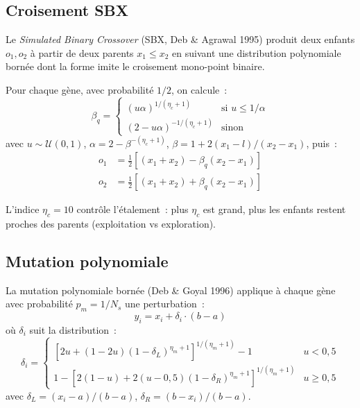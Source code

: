 \documentclass[12pt,a4paper]{article}
\numberwithin{equation}{section}
\numberwithin{figure}{section}
\numberwithin{table}{section}
\begin{document}
\subsection{Croisement SBX}

Le \emph{Simulated Binary Crossover} (SBX, Deb \& Agrawal 1995) produit deux
enfants $o_1, o_2$ à partir de deux parents $x_1 \leq x_2$ en suivant une
distribution polynomiale bornée dont la forme imite le croisement mono-point binaire.

Pour chaque gène, avec probabilité $1/2$, on calcule~:
\begin{equation}
    \beta_q = \begin{cases}
        (u\alpha)^{1/({\eta_c+1})} & \text{si } u \leq 1/\alpha \\
        (2-u\alpha)^{-1/({\eta_c+1})} & \text{sinon}
    \end{cases}
    \label{eq:sbx_beta}
\end{equation}
avec $u \sim \mathcal{U}(0,1)$,
$\alpha = 2 - \beta^{-(\eta_c+1)}$,
$\beta = 1 + 2(x_1 - l)/(x_2 - x_1)$,
puis~:
\begin{align}
    o_1 &= \tfrac{1}{2}\left[(x_1+x_2) - \beta_q(x_2-x_1)\right] \\
    o_2 &= \tfrac{1}{2}\left[(x_1+x_2) + \beta_q(x_2-x_1)\right]
    \label{eq:sbx_children}
\end{align}

L'indice $\eta_c = 10$ contrôle l'étalement~: plus $\eta_c$ est grand,
plus les enfants restent proches des parents (exploitation vs exploration).

\subsection{Mutation polynomiale}

La mutation polynomiale bornée (Deb \& Goyal 1996) applique à chaque gène
avec probabilité $p_m = 1/N_s$ une perturbation~:
\begin{equation}
    y_i = x_i + \delta_i \cdot (b-a)
    \label{eq:pm_mutation}
\end{equation}
où $\delta_i$ suit la distribution~:
\begin{equation}
    \delta_i = \begin{cases}
        \left[2u + (1-2u)(1-\delta_L)^{\eta_m+1}\right]^{1/(\eta_m+1)} - 1
        & u < 0{,}5 \\
        1 - \left[2(1-u) + 2(u-0{,}5)(1-\delta_R)^{\eta_m+1}\right]^{1/(\eta_m+1)}
        & u \geq 0{,}5
    \end{cases}
    \label{eq:pm_delta}
\end{equation}
avec $\delta_L = (x_i - a)/(b-a)$, $\delta_R = (b-x_i)/(b-a)$.
\end{document}
